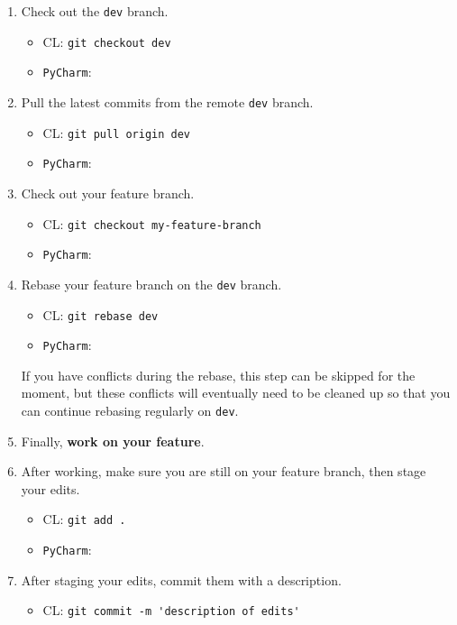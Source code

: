 \begin{enumerate}
    \item Check out the \verb|dev| branch.
    \label{itm:rebase_start}
    \begin{itemize} 
        \item CL: \verb|git checkout dev|
        \item \verb|PyCharm|:  
    \end{itemize} 
    \item Pull the latest commits from the remote \verb|dev| branch.
    \begin{itemize} 
        \item CL: \verb|git pull origin dev|
        \item \verb|PyCharm|:  
    \end{itemize} 
    \item Check out your feature branch.
    \begin{itemize} 
        \item CL: \verb|git checkout my-feature-branch|
        \item \verb|PyCharm|:  
    \end{itemize} 
    \item Rebase your feature branch on the \verb|dev| branch. 
    \label{itm:rebase_end}
    \begin{itemize} 
        \item CL: \verb|git rebase dev| 
        \item \verb|PyCharm|:  
    \end{itemize} 
    If you have conflicts during the rebase, 
    this step can be skipped for the moment,
    but these conflicts will eventually need to be cleaned up
    so that you can continue rebasing regularly on \verb|dev|.
    \item Finally, \textbf{work on your feature}. 
    \item After working, make sure you are still on your feature branch, 
    then stage your edits. 
    \begin{itemize} 
        \item CL: \verb|git add .| 
        \item \verb|PyCharm|:  
    \end{itemize} 
    \item After staging your edits, commit them with a description. 
    \label{itm:commitfeature} 
    \begin{itemize} 
        \item CL: \verb|git commit -m 'description of edits'| 

\end{itemize}
\end{enumerate}
